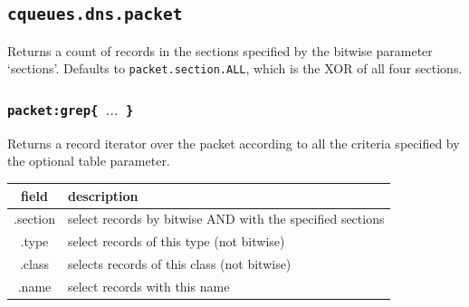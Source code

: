 \documentclass[11pt, oneside]{memoir}
\newcommand*{\fn}[1]{\texttt{#1}\xspace}
\newcounter{toccols}
\newenvironment{Module}[1]{
	\subsection{\texttt{#1}}
	\addtocontents{toc}{
		\protect\begin{multicols}{\value{toccols}}
	}
}{
	\addtocontents{toc}{\protect\end{multicols}}
}
\begin{document}
\begin{Module}{cqueues.dns.packet}
Returns a count of records in the sections specified by the bitwise parameter `sections'. Defaults to \texttt{packet.section.ALL}, which is the XOR of all four sections.

\subsubsection[\fn{packet:grep}]{\fn{packet:grep\{ $\ldots$ \}}}

Returns a record iterator over the packet according to all the criteria specified by the optional table parameter.

\begin{tabular}{ c | l }
field & description\\\hline
.section & select records by bitwise AND with the specified sections\\
.type & select records of this type (not bitwise)\\
.class & selects records of this class (not bitwise)\\
.name & select records with this name
\end{tabular}

\end{Module}
\end{document}
